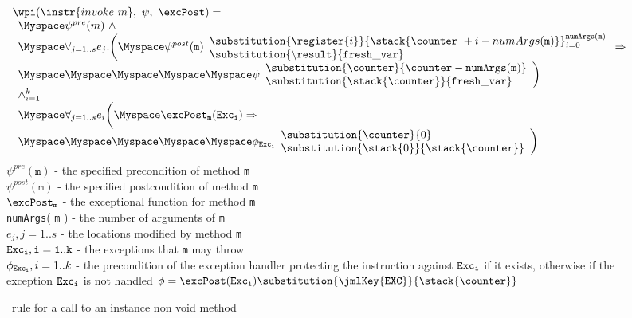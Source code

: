 \begin{figure}[!ht]
$$
\begin{array}{l}
\wpi(\instr{invoke \  m}, \ \psi ,\ \excPost) =\\ 
\begin{array}{l}
\Myspace \psi^{pre}(m) \ \wedge \\
\Myspace  \forall_{j = 1..s} e_{j}.\biggl( 
\Myspace \psi^{post}( \texttt{m}) 
                     \begin{array}{l}
                     \substitution{\register{i}}{\stack{\counter \ + i - numArgs(\texttt{m}) }}_{i=0}^{\tt{numArgs(m )}}  \\
                      \substitution{\tt{\backslash result} }{ fresh\_var } \\
                     \end{array} \Rightarrow  \\
\Myspace\Myspace\Myspace\Myspace\Myspace   \psi  \begin{array}{l}
                             \substitution{\counter }{\counter - \tt{numArgs}( \texttt{m} )} \\
                             \substitution{\stack{\counter } }{ \tt{fresh\_var}}  \   
                         \end{array}\biggr) \\
\wedge_{i = 1}^k\\
\Myspace \forall_{j = 1..s} e_i \biggl( 
\Myspace \excPost_{\tt{m} } ( \tt{Exc_i} )\Rightarrow \\
\Myspace\Myspace\Myspace\Myspace\Myspace   \phi_{\tt{Exc_i} }
                                 \begin{array}{l}
                                       \substitution{ \counter}{  0} \\
                                        \substitution{\stack{0}}{ \stack{\counter}}   
              		\end{array}   \biggr)   \\
\end{array} \\[15 mm]
\end{array}
$$
$\psi^{pre}(\texttt{m})$ -  the specified  precondition of  method \texttt{m} \\
$\psi^{post}(\texttt{m})$ - the   specified   postcondition   of   method  \texttt{m}  \\
$\excPost_{\texttt{m}}$ - the   exceptional   function   for   method  \texttt{m}  \\
\texttt{numArgs}( \texttt{m} ) -  the    number   of   arguments   of   \texttt{m} \\  
$e_{j} , j = 1 .. s$ - the   locations   modified   by   method   \texttt{m} \\
$\tt{Exc_i}, i = 1..k$ -  the   exceptions   that  \texttt{m} may  throw \\
$\phi_{\tt{Exc_i}}, i = 1..k$ -   the   precondition  
of the exception handler protecting the instruction against 
 $\tt{Exc_i} $  if   it    exists,   otherwise if   the exception   $\tt{Exc_i}$ is not handled    
   $ \phi = \excPost( \tt{Exc_i}) \substitution{ \jmlKey{EXC}}{ \stack{\counter}}$

\caption{\wpi \ rule for a call to an instance non void method}
\label{wpInv}
\end{figure}
